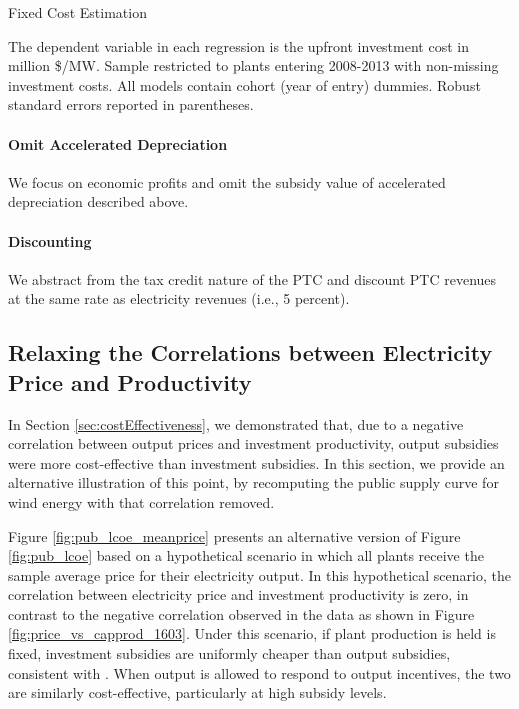 \documentclass[12pt]{article}
\begin{document}
\begin{table}[H]
\caption{Fixed Cost Estimation \label{tab:cost_prediction}}
\begin{center}

\end{center}
\footnotesize
The dependent variable in each regression is the upfront investment cost in million \$/MW. Sample restricted to plants entering 2008-2013 with non-missing investment costs. All models contain cohort (year of entry) dummies. Robust standard errors reported in parentheses.
\end{table}

\paragraph*{Omit Accelerated Depreciation}
We focus on economic profits and omit the subsidy value of accelerated depreciation described above.

\paragraph*{Discounting}
We abstract from the tax credit nature of the PTC and discount PTC revenues at the same rate as electricity revenues (i.e., 5 percent).


\subsection{Relaxing the Correlations between Electricity Price and Productivity \label{Appendix:PriceCorrelation}}

In Section \ref{sec:costEffectiveness}, we demonstrated that, due to a negative correlation between output prices and investment productivity, output subsidies were more cost-effective than investment subsidies. In this section, we provide an alternative illustration of this point, by recomputing the public supply curve for wind energy with that correlation removed. 

Figure \ref{fig:pub_lcoe_meanprice} presents an alternative version of Figure \ref{fig:pub_lcoe} based on a hypothetical scenario in which all plants receive the sample average price for their electricity output. In this hypothetical scenario, the correlation between electricity price and investment productivity is zero, in contrast to the negative correlation observed in the data as shown in Figure \ref{fig:price_vs_capprod_1603}. Under this scenario, if plant production is held is fixed, investment subsidies are uniformly cheaper than output subsidies, consistent with \citet{parish_relative_1982}. When output is allowed to respond to output incentives, the two are similarly cost-effective, particularly at high subsidy levels. 
\end{document}
